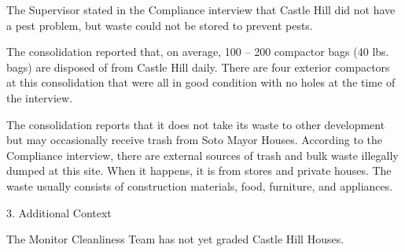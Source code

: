  

The Supervisor stated in the Compliance interview that Castle Hill did not have a pest problem, but waste could not be stored to prevent pests.



The consolidation reported that, on average, 100 -- 200 compactor bags (40 lbs. bags)  are disposed of from Castle Hill daily. There are four exterior compactors at this consolidation that were all in good condition with no holes at the time of the interview.  



The consolidation reports that it does not take its waste to other development but may occasionally receive trash from Soto Mayor Houses. According to the Compliance interview, there are external sources of trash and bulk waste illegally dumped at this site. When it happens, it is from stores and private houses. The waste usually consists of construction materials, food, furniture, and appliances. 



3. Additional Context 

The Monitor Cleanliness Team has not yet graded Castle Hill Houses.